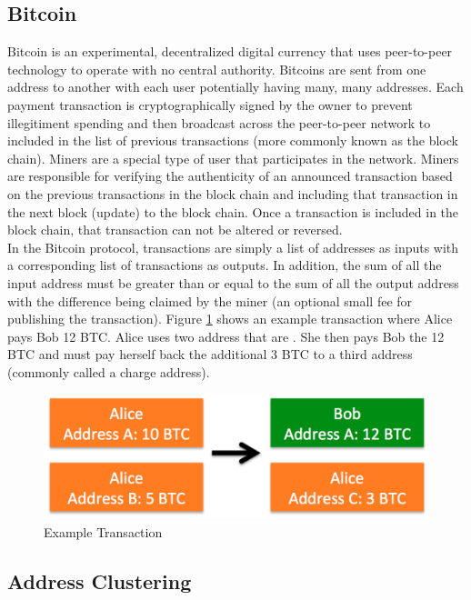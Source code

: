 \documentclass[10pt, letterpaper, twocolumn, twoside]{article}
\begin{document}
\subsection{Bitcoin}
Bitcoin is an experimental, decentralized digital currency that uses peer-to-peer technology to operate with no central authority. Bitcoins are sent from one address to another with each user potentially having many, many addresses. Each payment transaction is cryptographically signed by the owner to prevent illegitiment spending and then broadcast across the peer-to-peer network to included in the list of previous transactions (more commonly known as the block chain). Miners are a special type of user that participates in the network. Miners are responsible for verifying the authenticity of an announced transaction based on the previous transactions in the block chain and including that transaction in the next block (update) to the block chain. Once a transaction is included in the block chain, that transaction can not be altered or reversed.\\

In the Bitcoin protocol, transactions are simply a list of addresses as inputs with a corresponding list of transactions as outputs. In addition, the sum of all the input address must be greater than or equal to the sum of all the output address with the difference being claimed by the miner (an optional small fee for publishing the transaction).  Figure \ref{fig:transaction} shows an example transaction where Alice pays Bob 12 BTC. Alice uses two address that are . She then pays Bob the 12 BTC and must pay herself back the additional 3 BTC to a third address (commonly called a charge address).

\begin{figure}
  \includegraphics[width=\linewidth]{transaction.png}
  \caption{Example Transaction}
  \label{fig:transaction}
\end{figure}

\subsection{Address Clustering}
\end{document}
